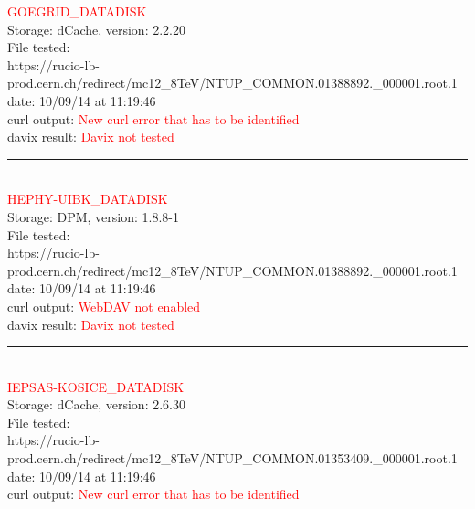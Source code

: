 \textcolor{red}{\normalsize{GOEGRID\_DATADISK}}\\

Storage: dCache, version: 2.2.20\\

File tested:\\
\footnotesize{https://rucio-lb-prod.cern.ch/redirect/mc12\_8TeV/NTUP\_COMMON.01388892.\_000001.root.1}\\

date: 10/09/14 at 11:19:46\\

curl output:  \textcolor{red}{New curl error that has to be identified}\\

davix result:  \textcolor{red}{Davix not tested}\\

\rule{\textwidth}{1pt}\\

\textcolor{red}{\normalsize{HEPHY-UIBK\_DATADISK}}\\

Storage: DPM, version: 1.8.8-1\\

File tested:\\
\footnotesize{https://rucio-lb-prod.cern.ch/redirect/mc12\_8TeV/NTUP\_COMMON.01388892.\_000001.root.1}\\

date: 10/09/14 at 11:19:46\\

curl output:  \textcolor{red}{WebDAV not enabled}\\

davix result:  \textcolor{red}{Davix not tested}\\

\rule{\textwidth}{1pt}\\

\textcolor{red}{\normalsize{IEPSAS-KOSICE\_DATADISK}}\\

Storage: dCache, version: 2.6.30\\

File tested:\\
\footnotesize{https://rucio-lb-prod.cern.ch/redirect/mc12\_8TeV/NTUP\_COMMON.01353409.\_000001.root.1}\\

date: 10/09/14 at 11:19:46\\

curl output:  \textcolor{red}{New curl error that has to be identified}\\

